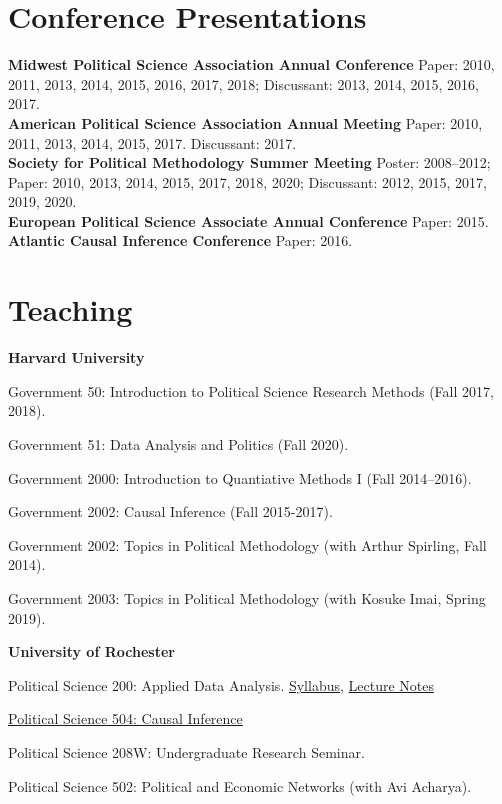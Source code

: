 \documentclass[margin,line,12pt]{res}
\newenvironment{list1}{
  \begin{list}{\ding{113}}{%
      \setlength{\itemsep}{0in}
      \setlength{\parsep}{0in} \setlength{\parskip}{0in}
      \setlength{\topsep}{0in} \setlength{\partopsep}{0in} 
      \setlength{\leftmargin}{0.83 cm}}}{\end{list}}
\begin{document}
\begin{resume}
\section{\textsf{\sc Conference Presentations}}
{\bf Midwest Political Science Association Annual Conference} Paper: 2010, 2011, 2013, 2014, 2015, 2016, 2017, 2018; Discussant: 2013, 2014, 2015, 2016, 2017.\\
{\bf American Political Science Association Annual Meeting} Paper: 2010, 2011, 2013, 2014, 2015, 2017. Discussant: 2017.\\
{\bf Society for Political Methodology Summer Meeting} Poster: 2008--2012; Paper: 2010, 2013, 2014, 2015, 2017, 2018, 2020; Discussant: 2012, 2015, 2017, 2019, 2020.\\
{\bf European Political Science Associate Annual Conference} Paper: 2015.\\ 
{\bf Atlantic Causal Inference Conference} Paper: 2016. \\

\section{\textsf{\sc Teaching}}
{\bf Harvard University}
\begin{list1}
\item[] Government 50: Introduction to Political Science Research Methods (Fall 2017, 2018).
    \item[] Government 51: Data Analysis and Politics (Fall 2020).
\item[] Government 2000: Introduction to Quantiative Methods I (Fall 2014--2016).
\item[] Government 2002: Causal Inference (Fall 2015-2017).
\item[] Government 2002: Topics in Political Methodology (with Arthur Spirling, Fall 2014).
\item[] Government 2003: Topics in Political Methodology (with Kosuke Imai, Spring 2019).
\end{list1}

{\bf University of Rochester}
\begin{list1}
\item[] Political Science 200: Applied Data Analysis. \href{http://www.mattblackwell.org/files/teaching/psc200-syllabus.pdf}{Syllabus}, \href{http://www.mattblackwell.org/files/teaching/psc200-notes.pdf}{Lecture Notes}
\item[] \href{http://www.mattblackwell.org/teaching/psc504/}{Political Science 504: Causal Inference}
\item[] Political Science 208W: Undergraduate Research Seminar.
\item[] Political Science 502: Political and Economic Networks (with Avi Acharya).
\end{list1}


\end{resume}
\end{document}

